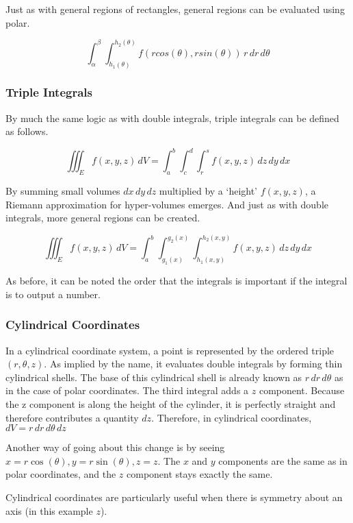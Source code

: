 \documentclass{notes}
\begin{document}
Just as with general regions of rectangles, general regions can be evaluated using polar.


\[\int_{\alpha}^{\beta}\int_{h_1(\theta)}^{h_2(\theta)}f(rcos(\theta), rsin(\theta))\, r \, dr \, d\theta\]

\subsubsection*{Triple Integrals}

By much the same logic as with double integrals, triple integrals can be defined as follows.

\[\iiint_E f(x, y, z)\, dV = \int_{a}^{b}\int_{c}^{d}\int_{r}^{s}f(x, y, z)\, dz \, dy \,dx\]

By summing small volumes \(dx \,dy \,dz\) multiplied by a `height' \(f(x, y, z)\), a Riemann approximation for hyper-volumes emerges. And just as with double integrals, more general regions can be created.

\[\iiint_E f(x, y, z)\, dV = \int_{a}^{b}\int_{g_1(x)}^{g_2(x)}\int_{h_1(x, y)}^{h_2(x, y)}f(x, y, z)\, dz \, dy \,dx\]

As before, it can be noted the order that the integrals is important if the integral is to output a number.

\subsubsection*{Cylindrical Coordinates}

In a cylindrical coordinate system, a point is represented by the ordered triple \((r, \theta, z)\). As implied by the name, it evaluates double integrals by forming thin cylindrical shells. The base of this cylindrical shell is already known as \(r\,dr\,d\theta\) as in the case of polar coordinates. The third integral adds a \(z\) component. Because the z component is along the height of the cylinder, it is perfectly straight and therefore contributes a quantity \(dz\). Therefore, in cylindrical coordinates, \(dV = r\,dr\,d\theta\,dz\)

Another way of going about this change is by seeing \(x = r \cos(\theta), y = r \sin(\theta), z = z\). The \(x\) and \(y\) components are the same as in polar coordinates, and the \(z\) component stays exactly the same.

Cylindrical coordinates are particularly useful when there is symmetry about an axis (in this example \(z\)).
\end{document}
